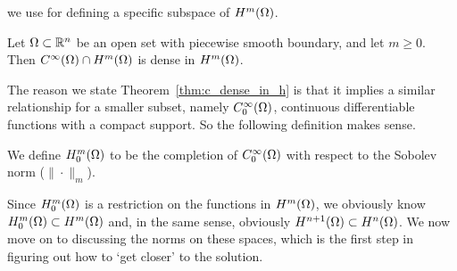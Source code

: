 we use for defining a specific subspace of $H^m(\Omega)$.
\begin{thmx}{\quad}
   Let $\Omega \subset \mathbb{R}^n$ be an open set with piecewise smooth boundary, 
   and let $m \geq 0$. Then $C^\infty (\Omega) \cap H^m(\Omega)$ is dense in 
   $H^m(\Omega)$.\label{thm:c_dense_in_h}
\end{thmx}
The reason we state Theorem~\ref{thm:c_dense_in_h} is that it implies a 
similar relationship for a smaller subset, namely $C^\infty_0(\Omega)$, 
continuous differentiable functions with a compact support. So the following 
definition makes sense.
\begin{defn}{\quad}
  We define $H_0^m(\Omega)$ to be the completion of $C^\infty_0(\Omega)$ with respect 
  to the Sobolev norm
 ($\| \cdot \|_m$).
\end{defn} 
Since $H_0^m(\Omega)$ is a restriction on the functions in $H^m(\Omega)$, 
we obviously know $H_0^m(\Omega) \subset H^m(\Omega)$ and, in the same 
sense, obviously $H^{n+1}(\Omega) \subset H^n(\Omega)$.
We now move on to discussing the norms on these spaces, 
which is the first step in figuring out how to `get closer' to 
the solution.
